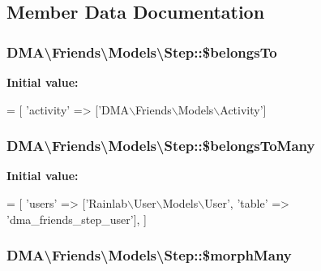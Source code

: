 \subsection{Member Data Documentation}
\hypertarget{classDMA_1_1Friends_1_1Models_1_1Step_a1e83eefa3362e3a1ec89b5599823c22d}{
\subsubsection[{\$belongs\-To}]{\setlength{\rightskip}{0pt plus 5cm}D\-M\-A\textbackslash{}\-Friends\textbackslash{}\-Models\textbackslash{}\-Step\-::\$belongs\-To}}\label{classDMA_1_1Friends_1_1Models_1_1Step_a1e83eefa3362e3a1ec89b5599823c22d}
{\bfseries Initial value\-:}
\begin{DoxyCode}
= [
        \textcolor{stringliteral}{'activity'}  => [\textcolor{stringliteral}{'DMA\(\backslash\)Friends\(\backslash\)Models\(\backslash\)Activity'}]
\end{DoxyCode}
\hypertarget{classDMA_1_1Friends_1_1Models_1_1Step_ac0b25912a2d3c62aa72e15e443648d81}{
\subsubsection[{\$belongs\-To\-Many}]{\setlength{\rightskip}{0pt plus 5cm}D\-M\-A\textbackslash{}\-Friends\textbackslash{}\-Models\textbackslash{}\-Step\-::\$belongs\-To\-Many}}\label{classDMA_1_1Friends_1_1Models_1_1Step_ac0b25912a2d3c62aa72e15e443648d81}
{\bfseries Initial value\-:}
\begin{DoxyCode}
= [
        \textcolor{stringliteral}{'users'} => [\textcolor{stringliteral}{'Rainlab\(\backslash\)User\(\backslash\)Models\(\backslash\)User'}, \textcolor{stringliteral}{'table'} => \textcolor{stringliteral}{'dma\_friends\_step\_user'}],
    ]
\end{DoxyCode}
\hypertarget{classDMA_1_1Friends_1_1Models_1_1Step_ae1aa1ff83758491327ea35861828b233}{
\subsubsection[{\$morph\-Many}]{\setlength{\rightskip}{0pt plus 5cm}D\-M\-A\textbackslash{}\-Friends\textbackslash{}\-Models\textbackslash{}\-Step\-::\$morph\-Many}}\label{classDMA_1_1Friends_1_1Models_1_1Step_ae1aa1ff83758491327ea35861828b233}
